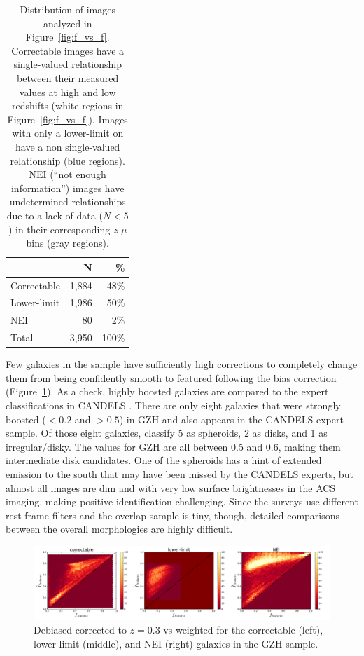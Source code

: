 \documentclass[twocolumn]{aastex6}
\begin{document}
\begin{table}
\center
\caption{Distribution of \ferengi{} images analyzed in Figure~\ref{fig:f_vs_f}. Correctable images have a single-valued relationship between their measured \ffeatures{} values at high and low redshifts (white regions in Figure~\ref{fig:f_vs_f}). Images with only a lower-limit on \ffeatures{} have a non single-valued relationship (blue regions). NEI (``not enough information'') images have undetermined relationships due to a lack of data ($N<5$) in their corresponding $z$-$\mu$ bins (gray regions).\label{tbl:ferengi_corrections}}
\begin{tabular}{lrr}
\hline \hline
				                   & N       & \% \\
\hline 
Correctable                        & 1,884   & 48\% \\
Lower-limit                        & 1,986   & 50\% \\
NEI                                & 80      &  2\%\\
Total                              & 3,950   & 100\% \\
\hline \hline
\end{tabular}
\end{table}

Few galaxies in the sample have sufficiently high corrections to completely change them from being confidently smooth to featured following the bias correction (Figure~\ref{fig:debiased_corrections}). As a check, highly boosted galaxies are compared to the expert classifications in CANDELS \citep{kar15}. There are only eight galaxies that were strongly boosted (\ffeatures$<0.2$ and \fbest$>0.5$) in GZH and also appears in the CANDELS expert sample. Of those eight galaxies, \citet{kar15} classify 5 as spheroids, 2 as disks, and 1 as irregular/disky. The \fbest{} values for GZH are all between 0.5 and 0.6, making them intermediate disk candidates. One of the spheroids has a hint of extended emission to the south that may have been missed by the CANDELS experts, but almost all images are dim and with very low surface brightnesses in the ACS imaging, making positive identification challenging. Since the surveys use different rest-frame filters and the overlap sample is tiny, though, detailed comparisons between the overall morphologies are highly difficult.

\begin{figure}
\center
\includegraphics[width=\textwidth]{figures/debiased_corrections.pdf}
\caption{Debiased \ffeatures{} corrected to $z=0.3$ vs weighted \ffeatures{} for the correctable (left), lower-limit (middle), and NEI (right) galaxies in the GZH sample.}
\label{fig:debiased_corrections}
\end{figure}
\end{document}
